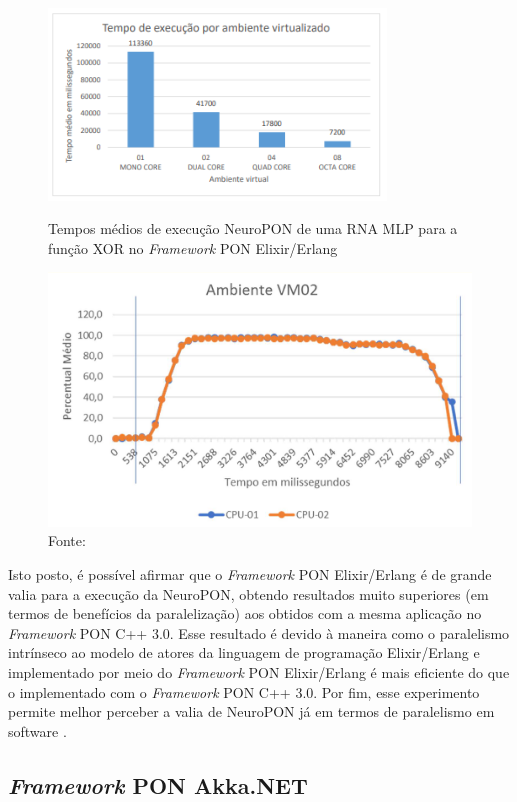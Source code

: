 \begin{figure}[!htb]
  \centering
  \includegraphics[width=0.8\textwidth]{../figures/neuropon_elixir.png}
  \smallskip
  \caption{Tempos médios de execução NeuroPON de uma RNA MLP para a função XOR
  no \textit{Framework} PON Elixir/Erlang} \includegraphics[width=\linewidth]{../figures/vm02.png}
    \smallskip
    \caption*{Fonte:
  }
  \label{fig:neuropon_elixir}
\end{figure}

Isto posto, é possível afirmar que o \textit{Framework} PON Elixir/Erlang é de
grande valia para a execução da NeuroPON, obtendo resultados muito superiores
(em termos de benefícios da paralelização) aos obtidos com a mesma aplicação no
\textit{Framework} PON C++ 3.0. Esse resultado é devido à maneira como o
paralelismo intrínseco ao modelo de atores da linguagem de programação
Elixir/Erlang e implementado por meio do \textit{Framework} PON Elixir/Erlang é
mais eficiente do que o implementado com o \textit{Framework} PON C++ 3.0. Por
fim, esse experimento permite melhor perceber a valia de NeuroPON já em termos
de paralelismo em software \cite{doc_Schutz_2019}.

\subsection{\textit{Framework} PON Akka.NET}\label{sec:akka}

